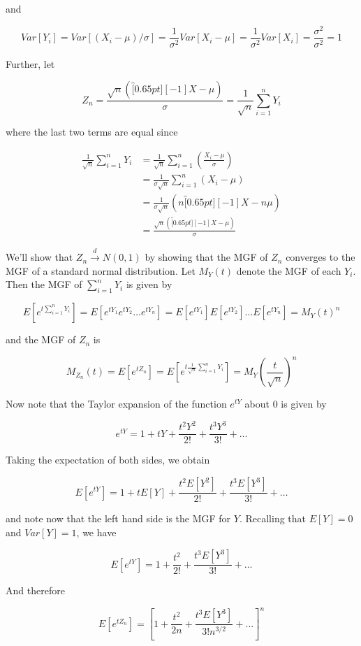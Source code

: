 \documentclass[
  letterpaper,
  DIV=11,
  numbers=noendperiod]{scrreprt}
\begin{document}
and

\[
Var[Y_i] = Var\left[ (X_i - \mu)/\sigma\right] = \frac{1}{\sigma^2} Var[X_i - \mu] = \frac{1}{\sigma^2} Var[X_i] = \frac{\sigma^2}{\sigma^2} = 1
\]

Further, let

\[
Z_n = \frac{\sqrt{n}(\overbracket[0.65pt][-1]{X} - \mu)}{\sigma} = \frac{1}{\sqrt{n}} \sum_{i = 1}^n Y_i
\]

where the last two terms are equal since

\begin{align*}
    \frac{1}{\sqrt{n}} \sum_{i = 1}^n Y_i & = \frac{1}{\sqrt{n}} \sum_{i = 1}^n \left( \frac{X_i - \mu}{\sigma}\right)\\
    & = \frac{1}{\sigma\sqrt{n}} \sum_{i = 1}^n (X_i - \mu) \\
    & = \frac{1}{\sigma\sqrt{n}}  (n\overbracket[0.65pt][-1]{X} - n\mu) \\
    & = \frac{\sqrt{n}(\overbracket[0.65pt][-1]{X} - \mu)}{\sigma}
\end{align*}

We'll show that \(Z_n \overset{d}{\to} N(0,1)\) by showing that the MGF
of \(Z_n\) converges to the MGF of a standard normal distribution. Let
\(M_Y(t)\) denote the MGF of each \(Y_i\). Then the MGF of
\(\sum_{i = 1}^n Y_i\) is given by

\[
E[e^{t\sum_{i = 1}^n Y_i}] = E[e^{tY_1}e^{tY_2} \dots e^{tY_n}] = E[e^{tY_1}]E[e^{tY_2}] \dots E[e^{tY_n}] = M_Y(t)^n
\]

and the MGF of \(Z_n\) is

\[
M_{Z_n}(t) = E[e^{tZ_n}] = E[e^{t\frac{1}{\sqrt{n}}\sum_{i = 1}^n Y_i}] = M_Y\left(\frac{t}{\sqrt{n}}\right)^n
\]

Now note that the Taylor expansion of the function \(e^{tY}\) about
\(0\) is given by

\[
e^{tY} = 1 + tY + \frac{t^2Y^2}{2!} + \frac{t^3Y^3}{3!} + \dots
\]

Taking the expectation of both sides, we obtain

\[
E[e^{tY}] = 1 + tE[Y] + \frac{t^2E[Y^2]}{2!} + \frac{t^3E[Y^3]}{3!} + \dots
\]

and note now that the left hand side is the MGF for \(Y\). Recalling
that \(E[Y] = 0\) and \(Var[Y] = 1\), we have

\[
E[e^{tY}] = 1  + \frac{t^2}{2!} + \frac{t^3E[Y^3]}{3!} + \dots
\]

And therefore

\[
E[e^{tZ_n}] = \left[1  + \frac{t^2}{2n} + \frac{t^3E[Y^3]}{3!n^{3/2}} + \dots \right]^n
\]
\end{document}
